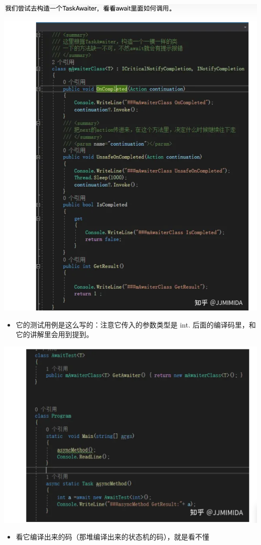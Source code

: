 \documentclass[9pt, b5paper]{article}
\begin{document}
\begin{center}
\includegraphics[width=.9\linewidth]{./pic/et3_20230609_105627.png}
\end{center}
\begin{itemize}
\item 它的测试用例是这么写的：注意它传入的参数类型是 int. 后面的编译码里，和它的讲解里会用到提到。
\end{itemize}

\begin{center}
\includegraphics[width=.9\linewidth]{./pic/et3_20230609_105927.png}
\end{center}
\begin{itemize}
\item 看它编译出来的码（那堆编译出来的状态机的码），就是看不懂
\end{itemize}
\end{document}
